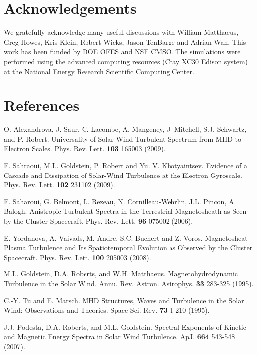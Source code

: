 \documentclass[aip,prl,amsmath,amssymb,reprint,superscriptaddress]{revtex4-1} %
\begin{document}
\section*{Acknowledgements}
  We gratefully acknowledge many useful discussions with William Matthaeus, Greg Howes, Kris Klein, Robert Wicks, Jason TenBarge and Adrian Wan. This work has been funded by DOE OFES and NSF CMSO.  The simulations were performed using the advanced computing resources (Cray XC30 Edison system) at the National Energy Research Scientific Computing Center.
\section*{References}
\begin{thebibliography}{99}

 O. Alexandrova, J. Saur, C. Lacombe, A. Mangeney, J. Mitchell, S.J. Schwartz, and P. Robert. Universality of Solar Wind Turbulent Spectrum from MHD to Electron Scales. Phys. Rev. Lett. {\bf 103} 165003 (2009).

 F. Sahraoui, M.L. Goldstein, P. Robert and Yu. V. Khotyaintsev. Evidence of a Cascade and Dissipation of Solar-Wind Turbulence at the Electron Gyroscale. Phys. Rev. Lett. {\bf 102} 231102 (2009).

 F. Saharoui, G. Belmont, L. Rezeau, N. Cornilleau-Wehrlin, J.L. Pincon, A. Balogh. Anistropic Turbulent Spectra in the Terrestrial Magnetosheath as Seen by the Cluster Spacecraft. Phys. Rev. Lett. {\bf 96} 075002 (2006).

 E. Yordanova, A. Vaivads, M. Andre, S.C. Buchert and Z. Voros. Magnetosheat Plasma Turbulence and Its Spatiotemporal Evolution as Observed by the Cluster Spacecraft. Phys. Rev. Lett. {\bf 100} 205003 (2008).

 M.L. Goldstein, D.A. Roberts, and W.H. Matthaeus. Magnetohydrodynamic Turbulence in the Solar Wind. Annu. Rev. Astron. Astrophys. {\bf 33} 283-325 (1995).

 C.-Y. Tu and E. Marsch. MHD Structures, Waves and Turbulence in the Solar Wind: Observations and Theories. Space Sci. Rev. {\bf 73} 1-210 (1995).

 J.J. Podesta, D.A. Roberts, and M.L. Goldstein. Spectral Exponents of Kinetic and Magnetic Energy Spectra in Solar Wind Turbulence. ApJ. {\bf 664} 543-548 (2007).


\end{thebibliography}
\end{document}
